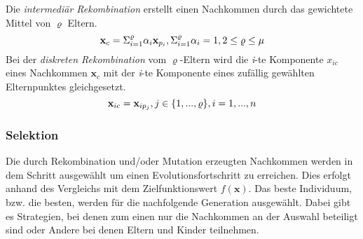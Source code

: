 Die \textit{intermediär Rekombination} erstellt einen Nachkommen durch das gewichtete Mittel von $\varrho$ Eltern.
%
\begin{equation}
\mathbf{x}_c = \Sigma^\varrho_{i=1} \alpha_i\mathbf{x}_{p_i},\\ \Sigma^\varrho_{i=1} \alpha_i = 1,\\ 2\leq\varrho\leq\mu
\end{equation} 
%
Bei der \textit{diskreten Rekombination} vom $\varrho$-Eltern wird die \textit{i}-te Komponente $x_{ic}$ eines Nachkommen $\mathbf{x}_c$ mit der \textit{i}-te Komponente eines zufällig gewählten Elternpunktes gleichgesetzt.
%
\begin{equation}
\mathbf{x}_{ic} = \mathbf{x}_{ip_j},\\ j\in\{1,...,\varrho\},\\i=1,...,n
\end{equation} 
%
\subsubsection[Selektion]{Selektion}
Die durch Rekombination und/oder Mutation erzeugten Nachkommen werden in dem Schritt ausgewählt um einen Evolutionsfortschritt zu erreichen. Dies erfolgt anhand des Vergleichs mit dem Zielfunktionswert $f(\mathbf{x})$. Das beste Individuum, bzw. die besten, werden für die nachfolgende Generation ausgewählt. Dabei gibt es Strategien, bei denen zum einen nur die Nachkommen an der Auswahl beteiligt sind oder Andere bei denen Eltern und Kinder teilnehmen.

